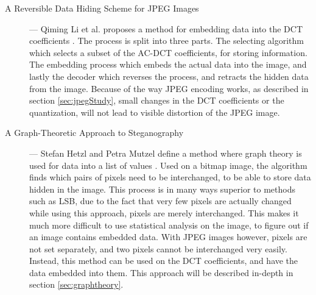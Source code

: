 \begin{description}
	\item[A Reversible Data Hiding Scheme for JPEG Images] ---		
	Qiming Li et al. proposes a method for embedding data into the DCT coefficients \citep{Li2010}.
	The process is split into three parts. The selecting algorithm which selects a subset of the AC-DCT coefficients, for storing information. 
	The embedding process which embeds the actual data into the image, and lastly the decoder which reverses the process, and retracts the hidden data from 	the image. 
	Because of the way JPEG encoding works, as described in section \ref{sec:jpegStudy}, small changes in the DCT coefficients or the quantization, will 		not lead to visible distortion of the JPEG image.
	
	\item[A Graph-Theoretic Approach to Steganography] ---
	Stefan Hetzl and Petra Mutzel define a method where graph theory is used for data into a list of values \citep{hetzl_2005}. 
	Used on a bitmap image, the algorithm finds which pairs of pixels need to be interchanged, to be able to store data hidden in the image. 
	This process is in many ways superior to methods such as LSB, due to the fact that very few pixels are actually changed while using this approach, 			pixels are 	merely interchanged.
	This makes it much more difficult to use statistical analysis on the image, to figure out if an image contains embedded data. 
	With JPEG images however, pixels are not set separately, and two pixels cannot be interchanged very easily. 
	Instead, this method can be used on the DCT coefficients, and have the data embedded into them.
	This approach will be described in-depth in section \ref{sec:graphtheory}.
\end{description}